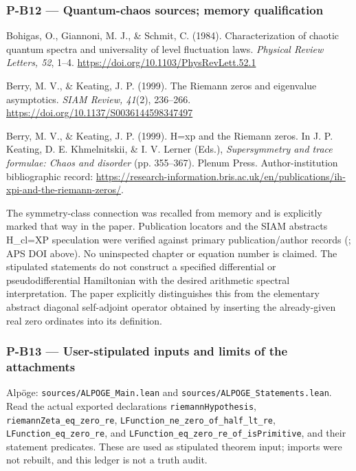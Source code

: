 \documentclass[11pt,a4paper]{article}
\theoremstyle{definition}\newtheorem{definition}{Definition}
\begin{document}
\subsubsection{P-B12 --- Quantum-chaos sources; memory
qualification}\label{p-b12--quantum-chaos-sources-memory-qualification}

Bohigas, O., Giannoni, M. J., \& Schmit, C. (1984). Characterization of
chaotic quantum spectra and universality of level fluctuation laws.
\emph{Physical Review Letters, 52}, 1--4.
\url{https://doi.org/10.1103/PhysRevLett.52.1}

Berry, M. V., \& Keating, J. P. (1999). The Riemann zeros and eigenvalue
asymptotics. \emph{SIAM Review, 41}(2), 236--266.
\url{https://doi.org/10.1137/S0036144598347497}

Berry, M. V., \& Keating, J. P. (1999). H=xp and the Riemann zeros. In
J. P. Keating, D. E. Khmelnitskii, \& I. V. Lerner (Eds.),
\emph{Supersymmetry and trace formulae: Chaos and disorder} (pp.
355--367). Plenum Press. Author-institution bibliographic record:
\url{https://research-information.bris.ac.uk/en/publications/ih-xpi-and-the-riemann-zeros/}.

The symmetry-class connection was recalled from memory and is explicitly
marked that way in the paper. Publication locators and the SIAM
abstract\textquotesingle s H\_cl=XP speculation were verified against
primary publication/author records (; APS DOI above). No uninspected
chapter or equation number is claimed. The stipulated statements do not
construct a specified differential or pseudodifferential Hamiltonian
with the desired arithmetic spectral interpretation. The paper
explicitly distinguishes this from the elementary abstract diagonal
self-adjoint operator obtained by inserting the already-given real zero
ordinates into its definition.

\subsubsection{P-B13 --- User-stipulated inputs and limits of the
attachments}\label{p-b13--user-stipulated-inputs-and-limits-of-the-attachments}

Alpöge: \nolinkurl{sources/ALPOGE_Main.lean} and
\nolinkurl{sources/ALPOGE_Statements.lean}. Read the actual exported
declarations \nolinkurl{riemannHypothesis},
\nolinkurl{riemannZeta_eq_zero_re},
\nolinkurl{LFunction_ne_zero_of_half_lt_re},
\nolinkurl{LFunction_eq_zero_re}, and
\nolinkurl{LFunction_eq_zero_re_of_isPrimitive}, and their statement
predicates. These are used as stipulated theorem input; imports were not
rebuilt, and this ledger is not a truth audit.
\end{document}
